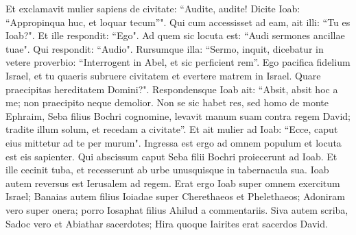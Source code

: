 \begin{biblechapter}
\verse Et exclamavit mulier sapiens de civitate: “Audite, audite! Dicite Ioab: “Appropinqua huc, et loquar tecum”". 
\verse Qui cum accessisset ad eam, ait illi: “Tu es Ioab?". Et ille respondit: “Ego". Ad quem sic locuta est: “Audi sermones ancillae tuae". Qui respondit: “Audio". 
\verse Rursumque illa: “Sermo, inquit, dicebatur in vetere proverbio: “Interrogent in Abel, et sic perficient rem”. 
\verse Ego pacifica fidelium Israel, et tu quaeris subruere civitatem et evertere matrem in Israel. Quare praecipitas hereditatem Domini?".  
\verse Respondensque Ioab ait: “Absit, absit hoc a me; non praecipito neque demolior. 
\verse Non se sic habet res, sed homo de monte Ephraim, Seba filius Bochri cognomine, levavit manum suam contra regem David; tradite illum solum, et recedam a civitate”. Et ait mulier ad Ioab: “Ecce, caput eius mittetur ad te per murum". 
\verse Ingressa est ergo ad omnem populum et locuta est eis sapienter. Qui abscissum caput Seba filii Bochri proiecerunt ad Ioab. Et ille cecinit tuba, et recesserunt ab urbe unusquisque in tabernacula sua. Ioab autem reversus est Ierusalem ad regem. 
\verse Erat ergo Ioab super omnem exercitum Israel; Banaias autem filius Ioiadae super Cherethaeos et Phelethaeos; 
\verse Adoniram vero super onera; porro Iosaphat filius Ahilud a commentariis. 
\verse Siva autem scriba, Sadoc vero et Abiathar sacerdotes; 
\verse Hira quoque Iairites erat sacerdos David. 
\end{biblechapter}

